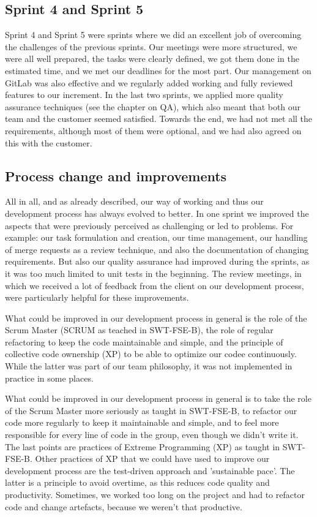 \subsection{Sprint 4 and Sprint 5}
Sprint 4 and Sprint 5 were sprints where we did an excellent job of overcoming the challenges of the previous sprints.
Our meetings were more structured, we were all well prepared, the tasks were clearly defined, we got them done in the estimated time, and we met our deadlines for the most part.
Our management on GitLab was also effective and we regularly added working and fully reviewed features to our increment.
In the last two sprints, we applied more quality assurance techniques (see the chapter on QA), which also meant that both our team and the customer seemed satisfied.
Towards the end, we had not met all the requirements, although most of them were optional, and we had also agreed on this with the customer.

\subsection{Process change and improvements}
All in all, and as already described, our way of working and thus our development process has always evolved to better.
In one sprint we improved the aspects that were previously perceived as challenging or led to problems.
For example: our task formulation and creation, our time management, our handling of merge requests as a review technique, and also the documentation of changing requirements.
But also our quality assurance had improved during the sprints, as it was too much limited to unit tests in the beginning.
The review meetings, in which we received a lot of feedback from the client on our development process, were particularly helpful for these improvements.

What could be improved in our development process in general is the role of the Scrum Master (SCRUM as teached in SWT-FSE-B), the role of regular refactoring to keep the code maintainable and simple, and the principle of collective code ownership (XP) to be able to optimize our codee continuously.
While the latter was part of our team philosophy, it was not implemented in practice in some places.

What could be improved in our development process in general is to take the role of the Scrum Master more seriously as taught in SWT-FSE-B,
to refactor our code more regularly to keep it maintainable and simple, and to feel more responsible for every line of code in the group, even though we didn't write it.
The last points are practices of Extreme Programming (XP) as taught in SWT-FSE-B.
Other practices of XP that we could have used to improve our development process are the test-driven approach and 'sustainable pace'.
The latter is a principle to avoid overtime, as this reduces code quality and productivity.
Sometimes, we worked too long on the project and had to refactor code and change artefacts, because we weren't that productive.

